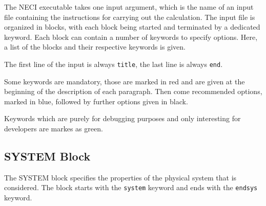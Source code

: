 \documentclass[a4paper,notitlepage,dvipsnames]{scrreprt}
\newcommand{\devcolor}[1]{\textcolor{mgreen}{#1}}
\begin{document}
The NECI executable takes one input argument, which is the name of an input
file containing the instructions for carrying out the calculation. The input
file is organized in blocks, with each block being started and terminated by a
dedicated keyword. Each block can contain a number of keywords to specify
options. Here, a list of the blocks and their respective keywords is given.

The first line of the input is always \texttt{title}, the last line is always
\texttt{end}.

Some keywords are mandatory, those are marked in \textcolor{mred}{red} and are
given at the beginning of the description of each paragraph. Then come
recommended options, marked in \textcolor{oblue}{blue}, followed by further
options given in black.

Keywords which are purely for debugging purposes and
  only interesting for developers are markes as \devcolor{green}.

\subsection{SYSTEM Block}
The SYSTEM block specifies the properties of the physical system that is
considered. The block starts with the \texttt{system} keyword and ends with
the \texttt{endsys} keyword.
\end{document}
